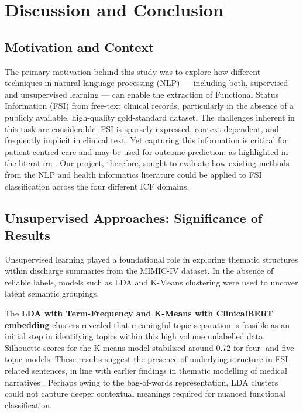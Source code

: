 
\chapter{Discussion and Conclusion}

\section{Motivation and Context}

The primary motivation behind this study was to explore how different techniques in natural language processing (NLP) — including both, supervised and unsupervised learning — can enable the extraction of Functional Status Information (FSI) from free-text clinical records, particularly in the absence of a publicly available, high-quality gold-standard dataset. The challenges inherent in this task are considerable: FSI is sparsely expressed, context-dependent, and frequently implicit in clinical text. Yet capturing this information is critical for patient-centred care and may be used for outcome prediction, as highlighted in the literature \cite{newman-griffis2019bh}. Our project, therefore, sought to evaluate how existing methods from the NLP and health informatics literature could be applied to FSI classification across the four different ICF domains.

\section{Unsupervised Approaches: Significance of Results}

Unsupervised learning played a foundational role in exploring thematic structures within discharge summaries from the MIMIC-IV dataset. In the absence of reliable labels, models such as LDA and K-Means clustering were used to uncover latent semantic groupings. \medskip

The \textbf{LDA with Term-Frequency and K-Means with ClinicalBERT embedding} clusters revealed that meaningful topic separation is feasible as an initial step in identifying topics within this high volume unlabelled data. Silhouette scores for the K-means model stabilised around 0.72 for four- and five-topic models. These results suggest the presence of underlying structure in FSI-related sentences, in line with earlier findings in thematic modelling of medical narratives \cite{low2020}. 
Perhaps owing to the bag-of-words representation, LDA clusters could not capture deeper contextual meanings required for nuanced functional classification.
\medskip


